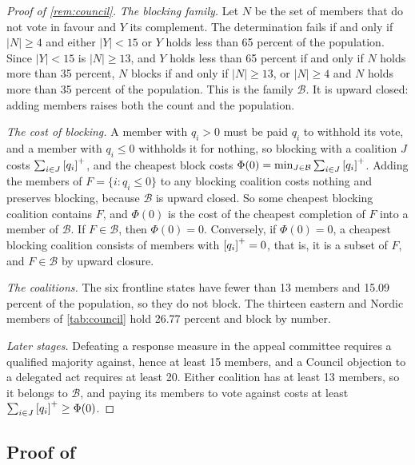 \begin{proof}[Proof of \cref{rem:council}]
\emph{The blocking family.} Let $N$ be the set of members that do not vote in favour and $Y$ its complement. The determination fails if and only if $|N|\ge 4$ and either $|Y|<15$ or $Y$ holds less than 65 percent of the population. Since $|Y|<15$ is $|N|\ge 13$, and $Y$ holds less than 65 percent if and only if $N$ holds more than 35 percent, $N$ blocks if and only if $|N|\ge 13$, or $|N|\ge 4$ and $N$ holds more than 35 percent of the population. This is the family $\mathcal B$. It is upward closed: adding members raises both the count and the population.

\emph{The cost of blocking.} A member with $q_i>0$ must be paid $q_i$ to withhold its vote, and a member with $q_i\le 0$ withholds it for nothing, so blocking with a coalition $J$ costs $\sum_{i\in J}\left[q_i\right]^{+}$, and the cheapest block costs $\Phi(0)=\min_{J\in\mathcal B}\sum_{i\in J}\left[q_i\right]^{+}$. Adding the members of $F=\{i:q_i\le 0\}$ to any blocking coalition costs nothing and preserves blocking, because $\mathcal B$ is upward closed. So some cheapest blocking coalition contains $F$, and $\Phi(0)$ is the cost of the cheapest completion of $F$ into a member of $\mathcal B$. If $F\in\mathcal B$, then $\Phi(0)=0$. Conversely, if $\Phi(0)=0$, a cheapest blocking coalition consists of members with $\left[q_i\right]^{+}=0$, that is, it is a subset of $F$, and $F\in\mathcal B$ by upward closure.

\emph{The coalitions.} The six frontline states have fewer than 13 members and 15.09 percent of the population, so they do not block. The thirteen eastern and Nordic members of \cref{tab:council} hold 26.77 percent and block by number.

\emph{Later stages.} Defeating a response measure in the appeal committee requires a qualified majority against, hence at least 15 members, and a Council objection to a delegated act requires at least 20. Either coalition has at least 13 members, so it belongs to $\mathcal B$, and paying its members to vote against costs at least $\sum_{i\in J}\left[q_i\right]^{+}\ge\Phi(0)$.
\end{proof}

\subsection{Proof of \texorpdfstring{}{pain and rupture}}

